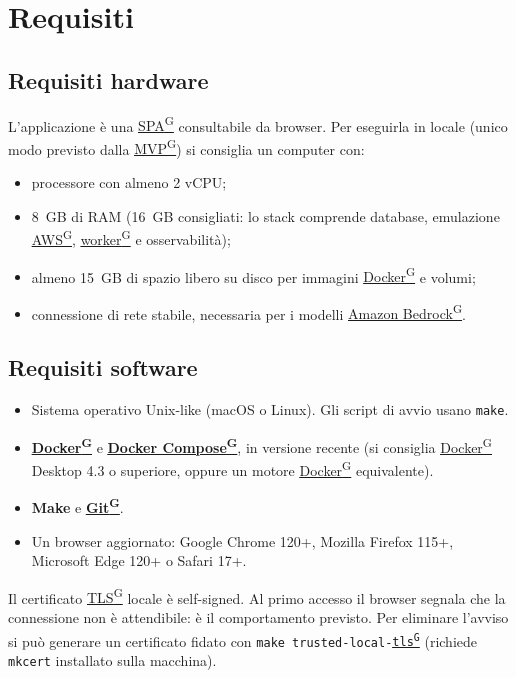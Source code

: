 \documentclass[a4paper,12pt]{article}
\providecommand{\glslink}[2]{\href{https://alittlebyte-19.github.io/Documentazione/glossario.html\#gls-#1}{\underline{#2}\textsuperscript{\scriptsize G}}}
\begin{document}
\section{Requisiti}

\subsection{Requisiti hardware}

L'applicazione è una \glslink{spa-single-page-application}{SPA} consultabile da browser. Per eseguirla in locale (unico modo previsto dalla \glslink{mvp-minimum-viable-product}{MVP}) si consiglia un computer con:

\begin{itemize}
    \item processore con almeno 2 vCPU;
    \item 8~GB di RAM (16~GB consigliati: lo stack comprende database, emulazione \glslink{aws}{AWS}, \glslink{worker}{worker} e osservabilità);
    \item almeno 15~GB di spazio libero su disco per immagini \glslink{docker}{Docker} e volumi;
    \item connessione di rete stabile, necessaria per i modelli \glslink{amazon-bedrock}{Amazon Bedrock}.
\end{itemize}

\subsection{Requisiti software}

\begin{itemize}
    \item Sistema operativo Unix-like (macOS o Linux). Gli script di avvio usano \texttt{make}.
    \item \textbf{\glslink{docker}{Docker}} e \textbf{\glslink{docker-compose}{Docker Compose}}, in versione recente (si consiglia \glslink{docker}{Docker} Desktop 4.3 o superiore, oppure un motore \glslink{docker}{Docker} equivalente).
    \item \textbf{Make} e \textbf{\glslink{git}{Git}}.
    \item Un browser aggiornato: Google Chrome 120+, Mozilla Firefox 115+, Microsoft Edge 120+ o Safari 17+.
\end{itemize}

Il certificato \glslink{tls-transport-layer-security}{TLS} locale è self-signed. Al primo accesso il browser segnala che la connessione non è attendibile: è il comportamento previsto. Per eliminare l'avviso si può generare un certificato fidato con \texttt{make trusted-local-\glslink{tls-transport-layer-security}{tls}} (richiede \texttt{mkcert} installato sulla macchina).
\end{document}
